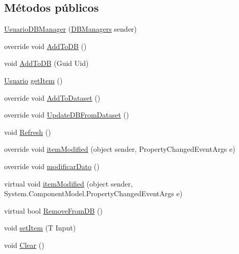 \subsection*{Métodos públicos}
\begin{DoxyCompactItemize}
\item 
\hyperlink{class_proyecto___integrador__3_1_1_d_b_managers_1_1_usuario_d_b_manager_a3bcff5c7839e9e78baaab699a68af438}{Usuario\-D\-B\-Manager} (\hyperlink{class_proyecto___integrador__3_1_1_d_b_managers}{D\-B\-Managers} sender)
\item 
override void \hyperlink{class_proyecto___integrador__3_1_1_d_b_managers_1_1_usuario_d_b_manager_a40976ea1cf23f128217f7379f175d504}{Add\-To\-D\-B} ()
\item 
void \hyperlink{class_proyecto___integrador__3_1_1_d_b_managers_1_1_usuario_d_b_manager_ac7fd33ab64b2c21ad0533c59eb77d118}{Add\-To\-D\-B} (Guid Uid)
\item 
\hyperlink{class_proyecto___integrador__3_1_1_tipos_dato_1_1_usuario}{Usuario} \hyperlink{class_proyecto___integrador__3_1_1_d_b_managers_1_1_usuario_d_b_manager_a4d3bacd63b66ffb89ff6f26156520072}{get\-Item} ()
\item 
override void \hyperlink{class_proyecto___integrador__3_1_1_d_b_managers_1_1_usuario_d_b_manager_a54c2d949592f354143fa7b7429ce1938}{Add\-To\-Dataset} ()
\item 
override void \hyperlink{class_proyecto___integrador__3_1_1_d_b_managers_1_1_usuario_d_b_manager_af38f312f9fd5a10d9a8d7d43e880d555}{Update\-D\-B\-From\-Dataset} ()
\item 
void \hyperlink{class_proyecto___integrador__3_1_1_d_b_managers_1_1_usuario_d_b_manager_a2aa56cfd9be44c7c601b1983e63bd6d6}{Refresh} ()
\item 
override void \hyperlink{class_proyecto___integrador__3_1_1_d_b_managers_1_1_usuario_d_b_manager_a3497931d99dff8f67c2da21b1328de1c}{item\-Modified} (object sender, Property\-Changed\-Event\-Args e)
\item 
override void \hyperlink{class_proyecto___integrador__3_1_1_d_b_managers_1_1_usuario_d_b_manager_a367d61aaac1f426d93800be80159eadd}{modificar\-Dato} ()
\item 
virtual void \hyperlink{class_proyecto___integrador__3_1_1_d_b_managers_1_1_d_b_manager_3_01_t_01_4_a49ea2a7bfa58a2c536fefa4d60d488d2}{item\-Modified} (object sender, System.\-Component\-Model.\-Property\-Changed\-Event\-Args e)
\item 
virtual bool \hyperlink{class_proyecto___integrador__3_1_1_d_b_managers_1_1_d_b_manager_3_01_t_01_4_a436cb08914ca84122f9019a59485589a}{Remove\-From\-D\-B} ()
\item 
void \hyperlink{class_proyecto___integrador__3_1_1_d_b_managers_1_1_d_b_manager_3_01_t_01_4_a2d552a5e547efd19924ca4a96f685a56}{set\-Item} (T Input)
\item 
void \hyperlink{class_proyecto___integrador__3_1_1_d_b_managers_1_1_d_b_manager_3_01_t_01_4_ad5d7f99a4a5783514bad64ba8894e1ea}{Clear} ()
\end{DoxyCompactItemize}
